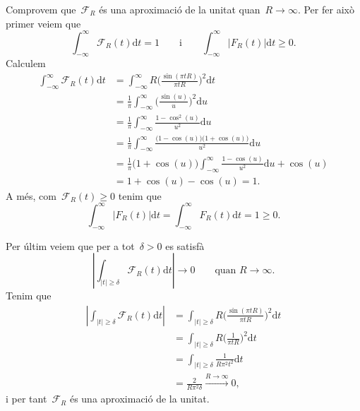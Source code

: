 \documentclass[a4paper]{article}
\theoremstyle{definition}
\providecommand{\uppi}{\pi}
\newcommand{\diff}{\mathrm{d}}
\newcommand{\abs}[1]{\lvert{#1}\rvert}
\newcommand{\Abs}[1]{\left\lvert{#1}\right\rvert}
\newcommand{\F}{\mathcal{F}}
\begin{document}
Comprovem que~\(\F_{R}\) és una aproximació de la unitat quan~\(R\to\infty\).
Per fer això primer veiem que
\[
    \int_{-\infty}^{\infty} \F_{R}(t) \diff t = 1
    \qquad\text{i}\qquad
    \int_{-\infty}^{\infty} \abs{F_{R}(t)} \diff t \geq 0.
\]
Calculem
\begin{align*}
    \int_{-\infty}^{\infty} \F_{R}(t)\diff t
        &= \int_{-\infty}^{\infty}
           R\biggl(\frac{\sin(\uppi tR)}{\uppi tR}\biggr)^{2}
           \diff t \\
        &= \frac{1}{\uppi}
           \int_{-\infty}^{\infty}
           \biggl(\frac{\sin(u)}{u}\biggr)^{2}
           \diff u \\
        &= \frac{1}{\uppi}
           \int_{-\infty}^{\infty}
           \frac{1-\cos^{2}(u)}{u^{2}}
           \diff u \\
        &= \frac{1}{\uppi}
           \int_{-\infty}^{\infty}
           \frac{\bigl(1-\cos(u)\bigr)\bigl(1+\cos(u)\bigr)}{u^{2}}
           \diff u \\
        &= \frac{1}{\uppi}
           \bigl(1+\cos(u)\bigr)
           \int_{-\infty}^{\infty}
           \frac{1-\cos(u)}{u^{2}}
           \diff u
           +
           \cos(u) \\
        &= 1 + \cos(u) - \cos(u) = 1.
\end{align*}
A més, com~\(\F_{R}(t) \geq 0\) tenim que
\[
    \int_{-\infty}^{\infty} \abs{F_{R}(t)} \diff t
    = \int_{-\infty}^{\infty} F_{R}(t) \diff t
    = 1 \geq 0.
\]

Per últim veiem que per a tot~\(\delta > 0\) es satisfà
\[
    \Abs{\int_{\abs{t}\geq\delta} \F_{R}(t)\diff t} \to 0
    \qquad
    \text{quan }
    R \to \infty.
\]
Tenim que
\begin{align*}
    \Abs{\int_{\abs{t}\geq\delta} \F_{R}(t) \diff t}
        &= \int_{\abs{t}\geq\delta}
           R\biggl(\frac{\sin(\uppi tR)}{\uppi tR}\biggr)^{2}
           \diff t \\
        &= \int_{\abs{t}\geq\delta}
           R\biggl(\frac{1}{\uppi tR}\biggr)^{2}
           \diff t \\
        &= \int_{\abs{t}\geq\delta}
           \frac{1}{R\uppi^{2}t^{2}}
           \diff t \\
        &= \frac{2}{R\uppi^{2}\delta} \xrightarrow{R\to\infty} 0,
\end{align*}
i per tant~\(\F_{R}\) és una aproximació de la unitat.
\end{document}
